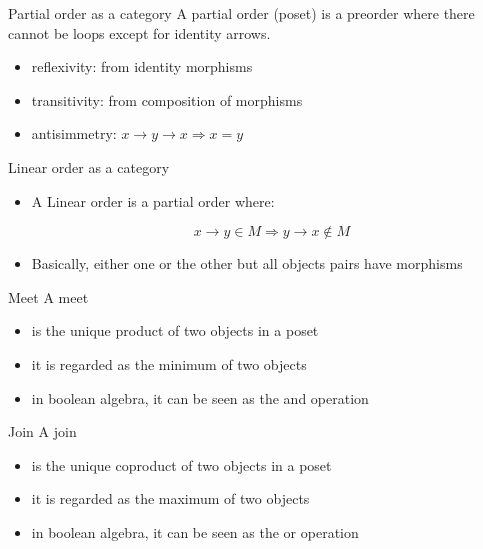 \documentclass[presentation]{beamer}
\begin{document}
\begin{frame}[label={sec:org2288448}]{Partial order as a category}
A \alert{partial order} (\alert{poset}) is a preorder where there cannot be loops except for
identity arrows.

\begin{itemize}
\item \alert{reflexivity}: from identity morphisms

\item \alert{transitivity}: from composition of morphisms

\item \alert{antisimmetry}: \(x \rightarrow y \rightarrow x \Rightarrow x = y\)
\end{itemize}
\end{frame}

\begin{frame}[label={sec:org9ff79d0}]{Linear order as a category}
\begin{itemize}
\item A Linear order is a partial order where:

\[x \rightarrow y \in M \Rightarrow y \rightarrow x \notin M\]

\item Basically, either one or the other but all objects pairs have morphisms
\end{itemize}
\end{frame}

\begin{frame}[label={sec:org5cc972a}]{Meet}
A \alert{meet}

\begin{itemize}
\item is the unique \alert{product} of two objects in a poset

\item it is regarded as the \alert{minimum} of two objects

\item in boolean algebra, it can be seen as the \alert{and} operation
\end{itemize}
\end{frame}

\begin{frame}[label={sec:orge49673c}]{Join}
A \alert{join}

\begin{itemize}
\item is the unique \alert{coproduct} of two objects in a poset

\item it is regarded as the maximum of two objects

\item in boolean algebra, it can be seen as the \alert{or} operation
\end{itemize}
\end{frame}
\end{document}
